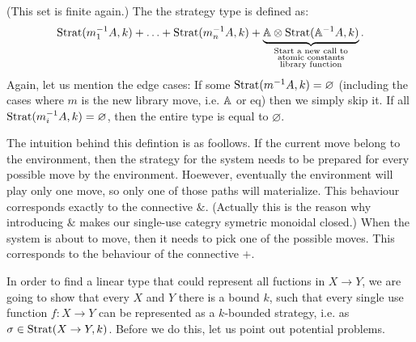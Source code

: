 \begin{definition}
\begin{itemize}
\begin{itemize}
               (This set is finite again.) The the strategy type is defined as: 
               \begin{align*}
                \text{Strat}(m_1^{-1}A, k) + \ldots + \text{Strat}(m_n^{-1}A, k) + \underbrace{\mathbb A \otimes \text{Strat}(\mathbb A^{-1}A, k)}_{\substack{\textrm{Start a new call to}\\
                \textrm{atomic constants}\\
                \textrm{library function}}}.
               \end{align*}
               Again, let us mention the edge cases: If some $\text{Strat}(m^{-1}A, k) = \varnothing$ (including the cases where $m$ is the new library move, i.e. $\mathbb A$ or $\text{eq}$)
               then we simply skip it. If all $\text{Strat}(m_i^{-1}A, k) = \varnothing$, then the entire type is equal to $\varnothing$. 
    \end{itemize}
\end{itemize}
\end{definition}
The intuition behind this defintion is as foollows. If the current move belong to the environment, then the strategy 
for the system needs to be prepared for every possible move by the environment. Hoewever, eventually the environment 
will play only one move, so only one of those paths will materialize. This behaviour corresponds exactly to the connective $\&$. 
(Actually this is the reason why introducing $\&$ makes our single-use categry symetric monoidal closed.) 
When the system is about to move, then it needs to pick one of the possible moves. This corresponds to the behaviour of the connective $+$.

In order to find a linear type that could represent all fuctions in $X \to Y$, we are going to show 
that every $X$ and $Y$ there is a bound $k$, such that every single use function $f : X \to Y$
can be represented as a $k$-bounded strategy, i.e. as $\sigma \in \text{Strat}(X \to Y, k)$. Before we do this, 
let us point out potential problems. 

